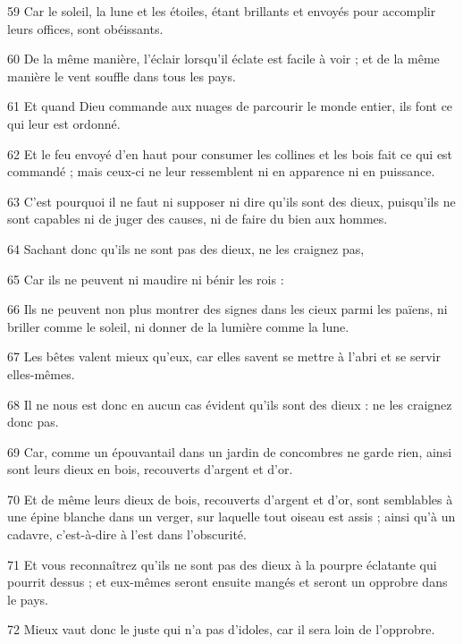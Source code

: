 \par 59 Car le soleil, la lune et les étoiles, étant brillants et envoyés pour accomplir leurs offices, sont obéissants.
\par 60 De la même manière, l'éclair lorsqu'il éclate est facile à voir ; et de la même manière le vent souffle dans tous les pays.
\par 61 Et quand Dieu commande aux nuages ​​de parcourir le monde entier, ils font ce qui leur est ordonné.
\par 62 Et le feu envoyé d'en haut pour consumer les collines et les bois fait ce qui est commandé ; mais ceux-ci ne leur ressemblent ni en apparence ni en puissance.
\par 63 C'est pourquoi il ne faut ni supposer ni dire qu'ils sont des dieux, puisqu'ils ne sont capables ni de juger des causes, ni de faire du bien aux hommes.
\par 64 Sachant donc qu'ils ne sont pas des dieux, ne les craignez pas,
\par 65 Car ils ne peuvent ni maudire ni bénir les rois :
\par 66 Ils ne peuvent non plus montrer des signes dans les cieux parmi les païens, ni briller comme le soleil, ni donner de la lumière comme la lune.
\par 67 Les bêtes valent mieux qu'eux, car elles savent se mettre à l'abri et se servir elles-mêmes.
\par 68 Il ne nous est donc en aucun cas évident qu'ils sont des dieux : ne les craignez donc pas.
\par 69 Car, comme un épouvantail dans un jardin de concombres ne garde rien, ainsi sont leurs dieux en bois, recouverts d'argent et d'or.
\par 70 Et de même leurs dieux de bois, recouverts d'argent et d'or, sont semblables à une épine blanche dans un verger, sur laquelle tout oiseau est assis ; ainsi qu'à un cadavre, c'est-à-dire à l'est dans l'obscurité.
\par 71 Et vous reconnaîtrez qu'ils ne sont pas des dieux à la pourpre éclatante qui pourrit dessus ; et eux-mêmes seront ensuite mangés et seront un opprobre dans le pays.
\par 72 Mieux vaut donc le juste qui n'a pas d'idoles, car il sera loin de l'opprobre.



